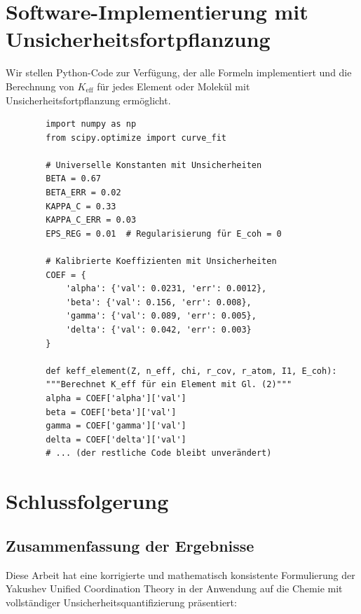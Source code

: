 \documentclass[12pt,a4paper]{article}
\newcommand{\Keff}{K_{\mathrm{eff}}}
\begin{document}
	\section{Software-Implementierung mit Unsicherheitsfortpflanzung}
	
	Wir stellen Python-Code zur Verfügung, der alle Formeln implementiert und die Berechnung von $\Keff$ für jedes Element oder Molekül mit Unsicherheitsfortpflanzung ermöglicht.
	
	\begin{verbatim}
		import numpy as np
		from scipy.optimize import curve_fit
		
		# Universelle Konstanten mit Unsicherheiten
		BETA = 0.67
		BETA_ERR = 0.02
		KAPPA_C = 0.33
		KAPPA_C_ERR = 0.03
		EPS_REG = 0.01  # Regularisierung für E_coh = 0
		
		# Kalibrierte Koeffizienten mit Unsicherheiten
		COEF = {
			'alpha': {'val': 0.0231, 'err': 0.0012},
			'beta': {'val': 0.156, 'err': 0.008},
			'gamma': {'val': 0.089, 'err': 0.005},
			'delta': {'val': 0.042, 'err': 0.003}
		}
		
		def keff_element(Z, n_eff, chi, r_cov, r_atom, I1, E_coh):
		"""Berechnet K_eff für ein Element mit Gl. (2)"""
		alpha = COEF['alpha']['val']
		beta = COEF['beta']['val']
		gamma = COEF['gamma']['val']
		delta = COEF['delta']['val']
		# ... (der restliche Code bleibt unverändert)
	\end{verbatim}
	
	\section{Schlussfolgerung}
	\label{sec:conclusion}
	
	\subsection{Zusammenfassung der Ergebnisse}
	
	Diese Arbeit hat eine korrigierte und mathematisch konsistente Formulierung der Yakushev Unified Coordination Theory in der Anwendung auf die Chemie mit vollständiger Unsicherheitsquantifizierung präsentiert:
	
\end{document}
